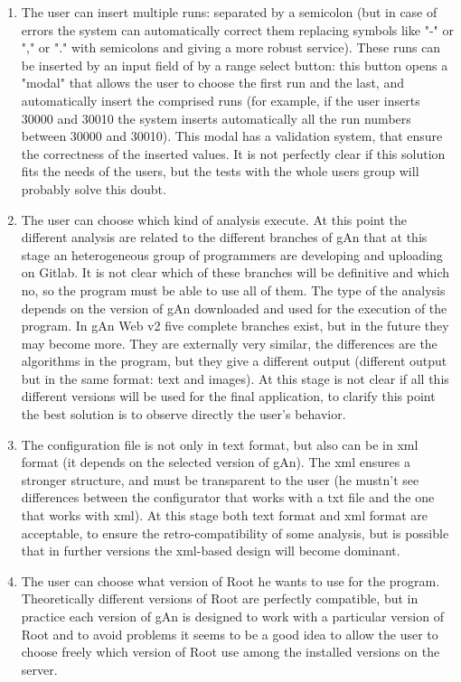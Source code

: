 \begin{enumerate}

\item The user can insert multiple runs: separated by a semicolon (but in case of errors the system can automatically correct them replacing symbols like "-" or "," or "." with semicolons and giving a more robust service). These runs can be inserted by an input field of by a range select button: this button opens a "modal" that allows the user to choose the first run and the last, and automatically insert the comprised runs (for example, if the user inserts 30000 and 30010 the system inserts automatically all the run numbers between 30000 and 30010). This modal has a validation system, that ensure the correctness of the inserted values. It is not perfectly clear if this solution fits the needs of the users, but the tests with the whole users group will probably solve this doubt. 

\item The user can choose which kind of analysis execute. At this point the different analysis are related to the different branches of gAn that at this stage an heterogeneous group of programmers are developing and uploading on Gitlab. It is not clear which of these branches will be definitive and which no, so the program must be able to use all of them. The type of the analysis depends on the version of gAn downloaded and used for the execution of the program. In gAn Web v2 five complete branches exist, but in the future they may become more. They are externally very similar, the differences are the algorithms in the program, but they give a different output (different output but in the same format: text and images). 
At this stage is not clear if all this different versions will be used for the final application, to clarify this point the best solution is to observe directly the user's behavior. 

\item The configuration file is not only in text format, but also can be in xml format (it depends on the selected version of gAn). The xml ensures a stronger structure, and must be transparent to the user (he mustn't see differences between the configurator that works with a txt file and the one that works with xml). At this stage both text format and xml format are acceptable, to ensure the retro-compatibility of some analysis, but is possible that in further versions the xml-based design will become dominant. 

\item The user can choose what version of Root he wants to use for the program. Theoretically different versions of Root are perfectly compatible, but in practice each version of gAn is designed to work with a particular version of Root and to avoid problems it seems to be a good idea to allow the user to choose freely which version of Root use among the installed versions on the server.  


\end{enumerate}
